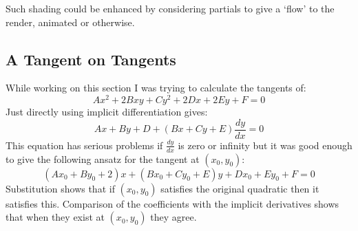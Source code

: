 Such shading could be enhanced by considering partials to give a `flow' to the render,
animated or otherwise.

\subsection{A Tangent on Tangents}
While working on this section I was trying to calculate the tangents of:
\[Ax^2+2Bxy+Cy^2+2Dx+2Ey+F=0\]
Just directly using implicit differentiation gives:
\[Ax+By+D+(Bx+Cy+E)\frac{dy}{dx}=0\]
This equation has serious problems if $\frac{dy}{dx}$ is zero or infinity but it was good enough to give the following ansatz for the tangent at $(x_0,y_0)$:
\[(Ax_0+By_0+2)x+(Bx_0+Cy_0+E)y+Dx_0+Ey_0+F=0\]
Substitution shows that if $(x_0,y_0)$ satisfies the original quadratic then it satisfies this.
Comparison of the coefficients with the implicit derivatives shows that when they exist at $(x_0,y_0)$ they agree.
